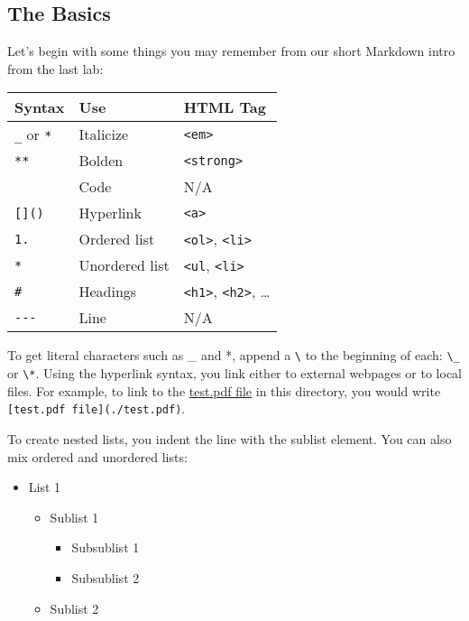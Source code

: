 \documentclass[11pt]{article}
\providecommand{\tightlist}{%
      \setlength{\itemsep}{0pt}\setlength{\parskip}{0pt}}
\begin{document}
    \hypertarget{basis}{}

\hypertarget{the-basics}{%
\subsection{The Basics}\label{the-basics}}

Let's begin with some things you may remember from our short Markdown
intro from the last lab:

\begin{longtable}[]{@{}lll@{}}
\toprule
Syntax & Use & HTML Tag\tabularnewline
\midrule
\endhead
\texttt{\_} or \texttt{*} & Italicize &
\texttt{\textless{}em\textgreater{}}\tabularnewline
\texttt{**} & Bolden &
\texttt{\textless{}strong\textgreater{}}\tabularnewline
\texttt{\textasciigrave{}} & Code & N/A\tabularnewline
\texttt{{[}{]}()} & Hyperlink &
\texttt{\textless{}a\textgreater{}}\tabularnewline
\texttt{1.} & Ordered list & \texttt{\textless{}ol\textgreater{}},
\texttt{\textless{}li\textgreater{}}\tabularnewline
\texttt{*} & Unordered list & \texttt{\textless{}ul},
\texttt{\textless{}li\textgreater{}}\tabularnewline
\texttt{\#} & Headings & \texttt{\textless{}h1\textgreater{}},
\texttt{\textless{}h2\textgreater{}}, \ldots{}\tabularnewline
\texttt{-\/-\/-} & Line & N/A\tabularnewline
\bottomrule
\end{longtable}

To get literal characters such as \_ and *, append a
\texttt{\textbackslash{}} to the beginning of each:
\texttt{\textbackslash{}\_} or \texttt{\textbackslash{}*}. Using the
hyperlink syntax, you link either to external webpages or to local
files. For example, to link to the \href{./test.pdf}{test.pdf file} in
this directory, you would write
\texttt{{[}test.pdf\ file{]}(./test.pdf)}.

To create nested lists, you indent the line with the sublist element.
You can also mix ordered and unordered lists:

\begin{itemize}
\tightlist
\item
  List 1

  \begin{itemize}
  \tightlist
  \item
    Sublist 1

    \begin{itemize}
    \tightlist
    \item
      Subsublist 1
    \item
      Subsublist 2
    \end{itemize}
  \item
    Sublist 2
  \end{itemize}
\end{itemize}
\end{document}
